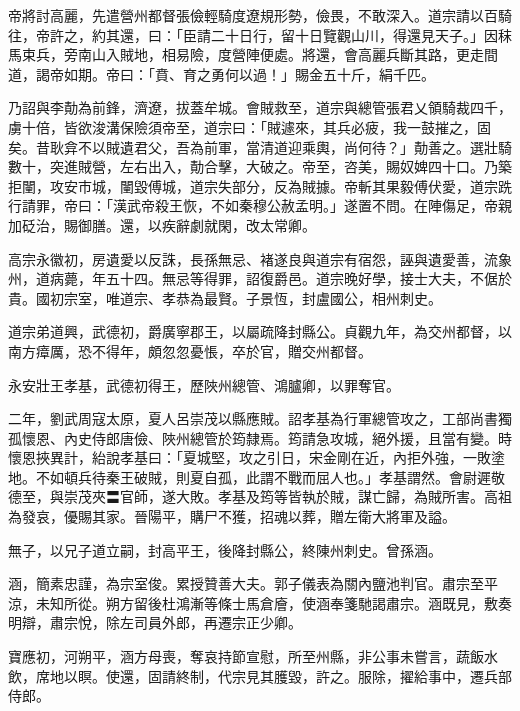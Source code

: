 \begin{pinyinscope}
 帝將討高麗，先遣營州都督張儉輕騎度遼規形勢，儉畏，不敢深入。道宗請以百騎往，帝許之，約其還，曰：「臣請二十日行，留十日覽觀山川，得還見天子。」因秣馬束兵，旁南山入賊地，相易險，度營陣便處。將還，會高麗兵斷其路，更走間道，謁帝如期。帝曰：「賁、育之勇何以過！」賜金五十斤，絹千匹。



 乃詔與李勣為前鋒，濟遼，拔蓋牟城。會賊救至，道宗與總管張君乂領騎裁四千，虜十倍，皆欲浚溝保險須帝至，道宗曰：「賊遽來，其兵必疲，我一鼓摧之，固矣。昔耿弇不以賊遺君父，吾為前軍，當清道迎乘輿，尚何待？」勣善之。選壯騎數十，突進賊營，左右出入，勣合擊，大破之。帝至，咨美，賜奴婢四十口。乃築拒闉，攻安市城，闉毀傅城，道宗失部分，反為賊據。帝斬其果毅傅伏愛，道宗跣行請罪，帝曰：「漢武帝殺王恢，不如秦穆公赦孟明。」遂置不問。在陣傷足，帝親加砭治，賜御膳。還，以疾辭劇就閑，改太常卿。



 高宗永徽初，房遺愛以反誅，長孫無忌、褚遂良與道宗有宿怨，誣與遺愛善，流象州，道病薨，年五十四。無忌等得罪，詔復爵邑。道宗晚好學，接士大夫，不倨於貴。國初宗室，唯道宗、孝恭為最賢。子景恆，封盧國公，相州刺史。



 道宗弟道興，武德初，爵廣寧郡王，以屬疏降封縣公。貞觀九年，為交州都督，以南方瘴厲，恐不得年，頗忽忽憂悵，卒於官，贈交州都督。



 永安壯王孝基，武德初得王，歷陜州總管、鴻臚卿，以罪奪官。



 二年，劉武周寇太原，夏人呂崇茂以縣應賊。詔孝基為行軍總管攻之，工部尚書獨孤懷恩、內史侍郎唐儉、陜州總管於筠隸焉。筠請急攻城，絕外援，且當有變。時懷恩挾異計，紿說孝基曰：「夏城堅，攻之引日，宋金剛在近，內拒外強，一敗塗地。不如頓兵待秦王破賊，則夏自孤，此謂不戰而屈人也。」孝基謂然。會尉遲敬德至，與崇茂夾〓官師，遂大敗。孝基及筠等皆執於賊，謀亡歸，為賊所害。高祖為發哀，優賜其家。晉陽平，購尸不獲，招魂以葬，贈左衛大將軍及謚。



 無子，以兄子道立嗣，封高平王，後降封縣公，終陳州刺史。曾孫涵。



 涵，簡素忠謹，為宗室俊。累授贊善大夫。郭子儀表為關內鹽池判官。肅宗至平涼，未知所從。朔方留後杜鴻漸等條士馬倉廥，使涵奉箋馳謁肅宗。涵既見，敷奏明辯，肅宗悅，除左司員外郎，再遷宗正少卿。



 寶應初，河朔平，涵方母喪，奪哀持節宣慰，所至州縣，非公事未嘗言，蔬飯水飲，席地以瞑。使還，固請終制，代宗見其臒毀，許之。服除，擢給事中，遷兵部侍郎。




\end{pinyinscope}
